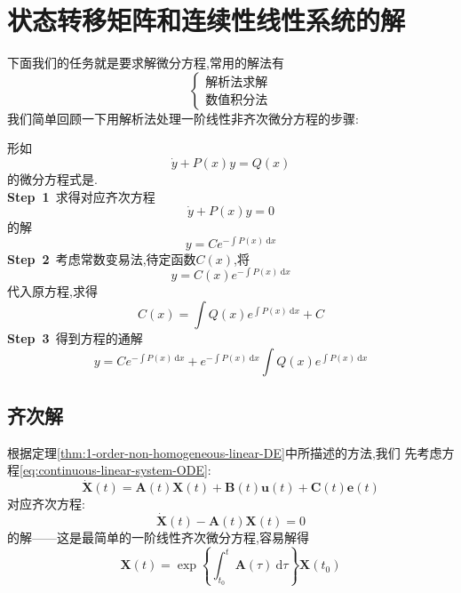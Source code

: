 \documentclass[cn,10pt,citestyle=gb7714-2015,bibstyle=gb7714-2015]{elegantbook}
\newcommand{\md}{\ \mathrm{d}}
\begin{document}
\section{状态转移矩阵和连续性线性系统的解}
下面我们的任务就是要求解微分方程,常用的解法有
\[
    \begin{cases}
      \text{解析法求解}\\
      \text{数值积分法}
    \end{cases}
\]
我们简单回顾一下用解析法处理一阶线性非齐次微分方程的步骤:
\begin{theorem}[一阶线性非齐次微分方程处理办法]\label{thm:1-order-non-homogeneous-linear-DE}
  形如
  \begin{equation}
    \dot{y}+P(x)y=Q(x)
  \end{equation}
  的微分方程式是.\\
  \textbf{Step\ 1}\ 求得对应齐次方程
  \[
      \dot{y}+P(x)y=0
  \]
  的解
  \begin{equation}
    y=Ce^{-\int \!P(x)\md x}
  \end{equation}
  \textbf{Step\ 2}\ 考虑常数变易法,待定函数$C(x)$,将
  \[
      y=C(x)e^{-\int \!P(x)\md x}
  \]
  代入原方程,求得
  \begin{equation}
    C(x)=\int Q(x)e^{\int \!P(x)\md x}+C
  \end{equation}
  \textbf{Step\ 3}\ 得到方程的通解
  \begin{equation}
    y=Ce^{-\int \!P(x)\md x}+e^{-\int \!P(x)\md x}\int Q(x)e^{\int \!P(x)\md x}
  \end{equation}
\end{theorem}
\subsection{齐次解}
根据定理\ref{thm:1-order-non-homogeneous-linear-DE}中所描述的方法,我们
先考虑方程\eqref{eq:continuous-linear-system-ODE}:
\[
    \dot{\bm{X}}(t)=\bm{A}(t)\bm{X}(t)+\bm{B}(t)\bm{u}(t)+\bm{C}(t)\bm{e}(t)
\]
对应齐次方程:
\begin{equation}\label{eq:homogeneous-equation}
    \dot{\bm{X}}(t)-\bm{A}(t)\bm{X}(t)=0
\end{equation}
的解——这是最简单的一阶线性齐次微分方程,容易解得
\begin{equation}\label{eq:homogeneous-solution}
  \bm{X}(t)=\exp\left\{\int_{t_0}^t\bm{A}(\tau)\md\tau\right\}\bm{X}(t_0)
\end{equation}
\end{document}
